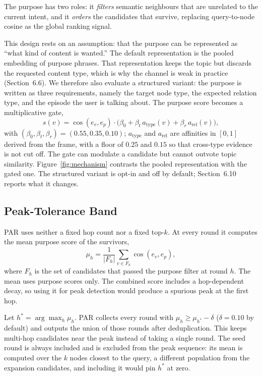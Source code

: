 \documentclass[11pt]{article}
\begin{document}
The purpose has two roles: it \emph{filters} semantic neighbours that are unrelated to the
current intent, and it \emph{orders} the candidates that survive, replacing query-to-node
cosine as the global ranking signal.

This design rests on an assumption: that the purpose can be represented as ``what kind of
content is wanted.'' The default representation is the pooled embedding of purpose phrases.
That representation keeps the topic but discards the requested content type, which is why the
channel is weak in practice (Section~6.6). We therefore also evaluate a structured
variant: the purpose is written as three requirements, namely the target node type, the
expected relation type, and the episode the user is talking about. The purpose score becomes a
multiplicative gate,
\begin{equation}
  s(v)=\cos(e_v,e_p)\cdot\bigl(\beta_0+\beta_t\,a_{\mathrm{type}}(v)
  +\beta_r\,a_{\mathrm{rel}}(v)\bigr),
\end{equation}
with $(\beta_0,\beta_t,\beta_r)=(0.55,0.35,0.10)$; $a_{\mathrm{type}}$ and $a_{\mathrm{rel}}$
are affinities in $[0,1]$ derived from the frame, with a floor of $0.25$ and $0.15$ so that
cross-type evidence is not cut off. The gate can modulate a candidate but cannot outvote topic
similarity. Figure~\ref{fig:mechanism} contrasts the pooled representation with the gated one.
The structured variant is opt-in and off by default; Section~6.10 reports what it changes.

\subsection{Peak-Tolerance Band}

PAR uses neither a fixed hop count nor a fixed top-$k$. At every round it computes the mean
purpose score of the survivors,
\begin{equation}
  \mu_h=\frac{1}{|F_h|}\sum_{v\in F_h}\cos(e_v,e_p),
\end{equation}
where $F_h$ is the set of candidates that passed the purpose filter at round $h$. The mean uses
purpose scores only. The combined score includes a hop-dependent decay, so using it for peak
detection would produce a spurious peak at the first hop.

Let $h^\ast=\arg\max_h\mu_h$. PAR collects every round with
$\mu_h\ge\mu_{h^\ast}-\delta$ ($\delta=0.10$ by default) and outputs the union of those rounds
after deduplication. This keeps multi-hop candidates near the peak instead of taking a single
round. The seed round is always included and is excluded from the peak sequence: its mean is
computed over the $k$ nodes closest to the query, a different population from the expansion
candidates, and including it would pin $h^\ast$ at zero.
\end{document}
